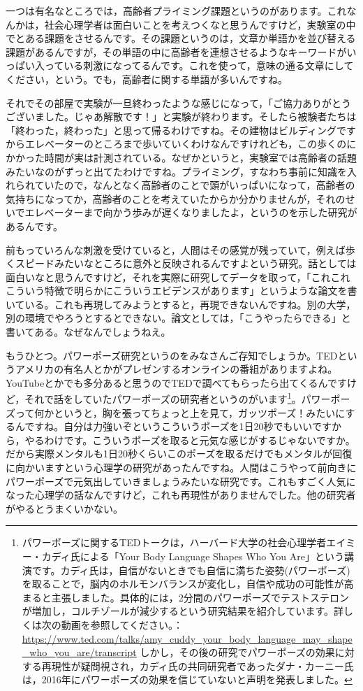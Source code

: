 \documentclass{ltjsbook}
\begin{document}
一つは有名なところでは，高齢者プライミング課題というのがあります\parencite{Bargh1996}。これなんかは，社会心理学者は面白いことを考えつくなと思うんですけど，実験室の中でとある課題をさせるんです。その課題というのは，文章か単語かを並び替える課題があるんですが，その単語の中に高齢者を連想させるようなキーワードがいっぱい入っている刺激になってるんです。これを使って，意味の通る文章にしてください，という。でも，高齢者に関する単語が多いんですね。

それでその部屋で実験が一旦終わったような感じになって，「ご協力ありがとうございました。じゃあ解散です！」と実験が終わります。そしたら被験者たちは「終わった，終わった」と思って帰るわけですね。その建物はビルディングですからエレベーターのところまで歩いていくわけなんですけれども，この歩くのにかかった時間が実は計測されている。なぜかというと，実験室では高齢者の話題みたいなのがずっと出てたわけですね。プライミング，すなわち事前に知識を入れられていたので，なんとなく高齢者のことで頭がいっぱいになって，高齢者の気持ちになってか，高齢者のことを考えていたからか分かりませんが，それのせいでエレベーターまで向かう歩みが遅くなりましたよ，というのを示した研究があるんです。

前もっていろんな刺激を受けていると，人間はその感覚が残っていて，例えば歩くスピードみたいなところに意外と反映されるんですよという研究。話としては面白いなと思うんですけど，それを実際に研究してデータを取って，「これこれこういう特徴で明らかにこういうエビデンスがあります」というような論文を書いている。これも再現してみようとすると，再現できないんですね。別の大学，別の環境でやろうとするとできない。論文としては，「こうやったらできる」と書いてある。なぜなんでしょうねえ。

もうひとつ。パワーポーズ研究というのをみなさんご存知でしょうか。TEDというアメリカの有名人とかがプレゼンするオンラインの番組がありますよね。YouTubeとかでも多分あると思うのでTEDで調べてもらったら出てくるんですけど，それで話をしていたパワーポーズの研究者というのがいます\footnote{パワーポーズに関するTEDトークは，ハーバード大学の社会心理学者エイミー・カディ氏による「Your Body Language Shapes Who You Are」という講演です。カディ氏は，自信がないときでも自信に満ちた姿勢(パワーポーズ)を取ることで，脳内のホルモンバランスが変化し，自信や成功の可能性が高まると主張しました。具体的には，2分間のパワーポーズでテストステロンが増加し，コルチゾールが減少するという研究結果を紹介しています。詳しくは次の動画を参照してください。：\url{https://www.ted.com/talks/amy_cuddy_your_body_language_may_shape_who_you_are/transcript} しかし，その後の研究でパワーポーズの効果に対する再現性が疑問視され，カディ氏の共同研究者であったダナ・カーニー氏は，2016年にパワーポーズの効果を信じていないと声明を発表しました。}。パワーポーズって何かというと，胸を張ってちょっと上を見て，ガッツポーズ！みたいにするんですね。自分は力強いぞというこういうポーズを1日20秒でもいいですから，やるわけです。こういうポーズを取ると元気な感じがするじゃないですか。だから実際メンタルも1日20秒くらいこのポーズを取るだけでもメンタルが回復に向かいますという心理学の研究があったんですね。人間はこうやって前向きにパワーポーズで元気出していきましょうみたいな研究です。これもすごく人気になった心理学の話なんですけど，これも再現性がありませんでした。他の研究者がやるとうまくいかない。
\end{document}
